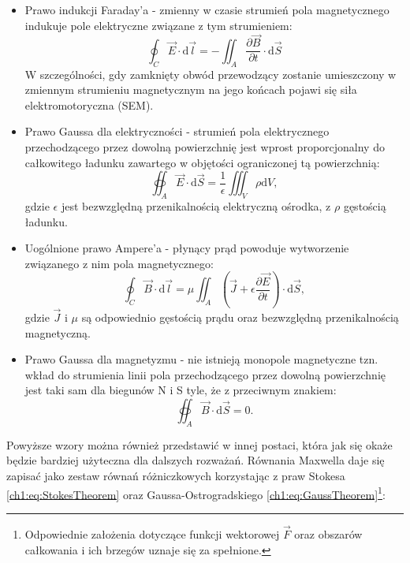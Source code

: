 \begin{itemize}
\item Prawo indukcji Faraday'a - zmienny w czasie strumień pola magnetycznego indukuje pole elektryczne związane z tym strumieniem:
\begin{equation}
\oint_C\vec{E}\cdot \mathrm{d}\vec{l} = -\iint_A\frac{\partial\vec{B}}{\partial t}\cdot \mathrm{d}\vec{S}
\label{ch1:eq:Faraday}
\end{equation}
W szczególności, gdy zamknięty obwód przewodzący zostanie umieszczony w zmiennym strumieniu magnetycznym na jego końcach pojawi się siła elektromotoryczna (SEM).
\item Prawo Gaussa dla elektryczności - strumień pola elektrycznego przechodzącego przez dowolną powierzchnię jest wprost proporcjonalny do całkowitego ładunku zawartego w objętości ograniczonej tą powierzchnią:
\begin{equation}
\oiint_A \vec{E}\cdot\mathrm{d}\vec{S} = \frac{1}{\epsilon}\iiint_V\rho\mathrm{d}V,
\label{ch1:eq:Gauss}
\end{equation}
gdzie $\epsilon$ jest bezwzględną przenikalnością elektryczną ośrodka, z $\rho$ gęstością ładunku.
\item Uogólnione prawo Ampere'a - płynący prąd powoduje wytworzenie związanego z nim pola magnetycznego:
\begin{equation}
\oint_C\vec{B}\cdot\mathrm{d}\vec{l} = \mu\iint_A\left(\vec{J} + \epsilon\frac{\partial\vec{E}}{\partial t} \right)\cdot\mathrm{d}\vec{S}, 
\label{ch1:eq:Ampere}
\end{equation}
gdzie $\vec{J}$ i $\mu$ są odpowiednio gęstością prądu oraz bezwzględną przenikalnością magnetyczną.
\item Prawo Gaussa dla magnetyzmu - nie istnieją monopole magnetyczne tzn. wkład do strumienia linii pola przechodzącego przez dowolną powierzchnię jest taki sam dla biegunów N i S tyle, że z przeciwnym znakiem:
\begin{equation}
\oiint_A \vec{B}\cdot\mathrm{d}\vec{S} = 0.
\label{ch1:eq:GaussB}
\end{equation}
\end{itemize}
Powyższe wzory można również przedstawić w innej postaci, która jak się okaże będzie bardziej użyteczna dla dalszych rozważań. Równania Maxwella daje się zapisać jako zestaw równań różniczkowych korzystając z praw Stokesa \eqref{ch1:eq:StokesTheorem} oraz Gaussa-Ostrogradskiego \eqref{ch1:eq:GaussTheorem}\footnote{Odpowiednie założenia dotyczące funkcji wektorowej $\vec{F}$ oraz obszarów całkowania i ich brzegów uznaje się za spełnione.}:

